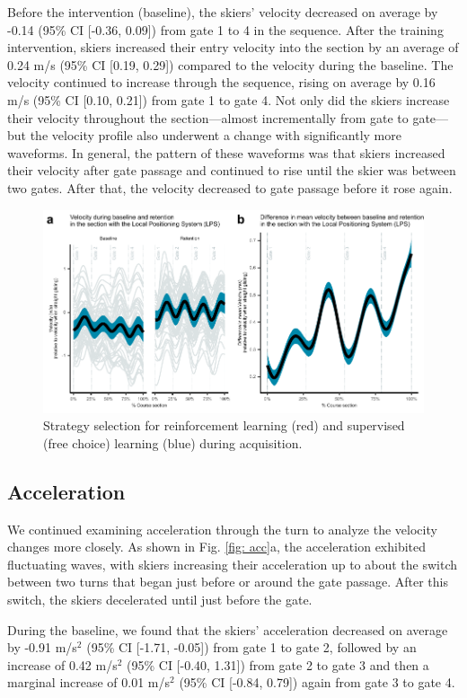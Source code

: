\documentclass{article}
\begin{document}
Before the intervention (baseline), the skiers' velocity decreased on average by -0.14 (95\% CI [-0.36, 0.09]) from gate 1 to 4 in the sequence. After the training intervention, skiers increased their entry velocity into the section by an average of 0.24 m/s (95\% CI [0.19, 0.29]) compared to the velocity during the baseline. The velocity continued to increase through the sequence, rising on average by 0.16 m/s (95\% CI [0.10, 0.21]) from gate 1 to gate 4. Not only did the skiers increase their velocity throughout the section—almost incrementally from gate to gate—but the velocity profile also underwent a change with significantly more waveforms. In general, the pattern of these waveforms was that skiers increased their velocity after gate passage and continued to rise until the skier was between two gates. After that, the velocity decreased to gate passage before it rose again. 
\begin{figure}[H]
\centering
\includegraphics{figurer/figure_velocity_2.pdf}
\caption{Strategy selection for reinforcement learning (red) and supervised (free choice) learning (blue) during acquisition.}\label{fig: choice_estimated}
\end{figure}

\subsection{Acceleration}
We continued examining acceleration through the turn to analyze the velocity changes more closely. As shown in Fig. \ref{fig: acc}a, the acceleration exhibited fluctuating waves, with skiers increasing their acceleration up to about the switch between two turns that began just before or around the gate passage. After this switch, the skiers decelerated until just before the gate. 

During the baseline, we found that the skiers' acceleration decreased on average by -0.91 m/s$^2$ (95\% CI [-1.71, -0.05]) from gate 1 to gate 2, followed by an increase of 0.42 m/s$^2$ (95\% CI [-0.40, 1.31]) from gate 2 to gate 3 and then a marginal increase of 0.01 m/s$^2$ (95\% CI [-0.84, 0.79]) again from gate 3 to gate 4.
\end{document}
